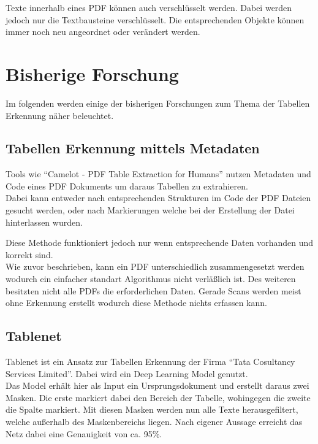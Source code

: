 \documentclass[
]{article}
\begin{document}
Texte innerhalb eines PDF können auch verschlüsselt werden. Dabei werden
jedoch nur die Textbausteine verschlüsselt. Die entsprechenden Objekte
können immer noch neu angeordnet oder verändert werden.

\hypertarget{header-n66}{%
\section{Bisherige Forschung}\label{header-n66}}

Im folgenden werden einige der bisherigen Forschungen zum Thema der
Tabellen Erkennung näher beleuchtet.

\hypertarget{header-n68}{%
\subsection{Tabellen Erkennung mittels Metadaten}\label{header-n68}}

Tools wie ``Camelot - PDF Table Extraction for Humans'' nutzen Metadaten
und Code eines PDF Dokuments um daraus Tabellen zu extrahieren. \\
Dabei kann entweder nach entsprechenden Strukturen im Code der PDF
Dateien gesucht werden, oder nach Markierungen welche bei der Erstellung
der Datei hinterlassen wurden.

Diese Methode funktioniert jedoch nur wenn entsprechende Daten vorhanden
und korrekt sind. \\
Wie zuvor beschrieben, kann ein PDF unterschiedlich zusammengesetzt
werden wodurch ein einfacher standart Algorithmus nicht verläßlich ist.
Des weiteren besitzten nicht alle PDFs die erforderlichen Daten. Gerade
Scans werden meist ohne Erkennung erstellt wodurch diese Methode nichts
erfassen kann.

\hypertarget{header-n71}{%
\subsection{Tablenet}\label{header-n71}}

Tablenet ist ein Ansatz zur Tabellen Erkennung der Firma ``Tata
Cosultancy Services Limited''. Dabei wird ein Deep Learning Model
genutzt.\\
Das Model erhält hier als Input ein Ursprungsdokument und erstellt
daraus zwei Masken. Die erste markiert dabei den Bereich der Tabelle,
wohingegen die zweite die Spalte markiert. Mit diesen Masken werden nun
alle Texte herausgefiltert, welche außerhalb des Maskenbereichs liegen.
Nach eigener Aussage erreicht das Netz dabei eine Genauigkeit von ca.
95\%.
\end{document}

